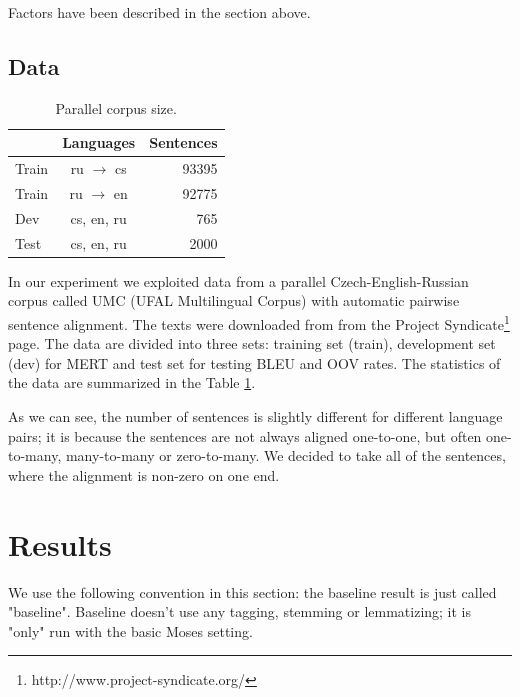 \documentclass[11pt,letterpaper]{article}
\begin{document}
Factors have been described in the section above.

\subsection{Data}
\begin{table}

\begin{center}
\begin{tabular}{lcr}
  &  Languages & Sentences \\
\hline
Train & ru $\rightarrow$ cs &  93395\\
Train & ru $\rightarrow$ en &  92775\\ \hline %
Dev & cs, en, ru          &    765 \\
Test  & cs, en, ru          &  2000 \\
\hline
\end{tabular}
\end{center}
\caption{Parallel corpus size.}
\label{tab:corpus}
\end{table}

In our experiment we exploited data from a parallel Czech-English-Russian
corpus called UMC (UFAL Multilingual Corpus) with automatic pairwise sentence
alignment. The texts were downloaded from from the Project
Syndicate\footnote{http://www.project-syndicate.org/} page. 
The data are divided into three sets: training set (train),
development set (dev) for MERT and test set for testing BLEU and OOV rates.
The statistics of the data are summarized in the Table \ref{tab:corpus}.

As we can see, the number of sentences is slightly different for different language pairs; it is because the sentences are not always aligned one-to-one, but often one-to-many, many-to-many or zero-to-many. We decided to take all of the sentences, where the alignment is non-zero on one end. 

\section{Results}

We use the following convention in this section: the baseline result is just called "baseline". Baseline doesn't use any tagging, stemming or lemmatizing; it is "only" run with the basic Moses setting.
\end{document}
